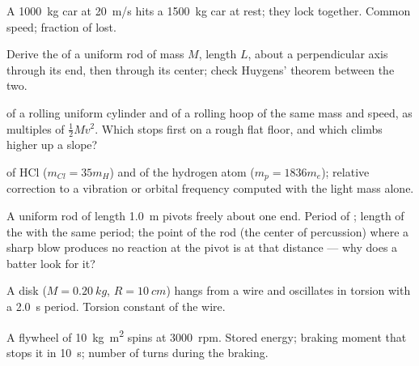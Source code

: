 \begin{exercise}[$\star$]\label{exo:b1:systems-of-points:3}
A \qty{1000}{kg} car at \qty{20}{m/s} hits a \qty{1500}{kg} car at rest;
they lock together. Common speed; fraction of  lost.
\end{exercise}

\begin{exercise}[$\star$]\label{exo:b1:systems-of-points:4}
Derive the  of a uniform rod of mass $M$, length $L$,
about a perpendicular axis through its end, then through its center;
check Huygens' theorem between the two.
\end{exercise}

\begin{exercise}[$\star\star$]\label{exo:b1:systems-of-points:5}
 of a rolling uniform cylinder and of a rolling hoop of
the same mass and speed, as multiples of $\tfrac12 Mv^2$. Which stops
first on a rough flat floor, and which climbs higher up a slope?
\end{exercise}

\begin{exercise}[$\star\star$]\label{exo:b1:systems-of-points:6}
 of HCl ($m_{Cl} = 35m_H$) and of the hydrogen atom
($m_p = 1836m_e$); relative correction to a vibration or orbital
frequency computed with the light mass alone.
\end{exercise}

\begin{exercise}[$\star\star$]\label{exo:b1:systems-of-points:7}
A uniform rod of length \qty{1.0}{m} pivots freely about one end. Period
of ; length of the  with the same
period; the point of the rod (the center of percussion) where a sharp
blow produces no reaction at the pivot is at that distance --- why does
a batter look for it?
\end{exercise}

\begin{exercise}[$\star\star$]\label{exo:b1:systems-of-points:8}
A disk ($M = \qty{0.20}{kg}$, $R = \qty{10}{cm}$) hangs from a wire and
oscillates in torsion with a \qty{2.0}{s} period. Torsion constant of
the wire.
\end{exercise}

\begin{exercise}[$\star\star$]\label{exo:b1:systems-of-points:9}
A flywheel of  \qty{10}{kg.m^2} spins at \qty{3000}{rpm}.
Stored energy; braking moment that stops it in \qty{10}{s}; number of
turns during the braking.
\end{exercise}

